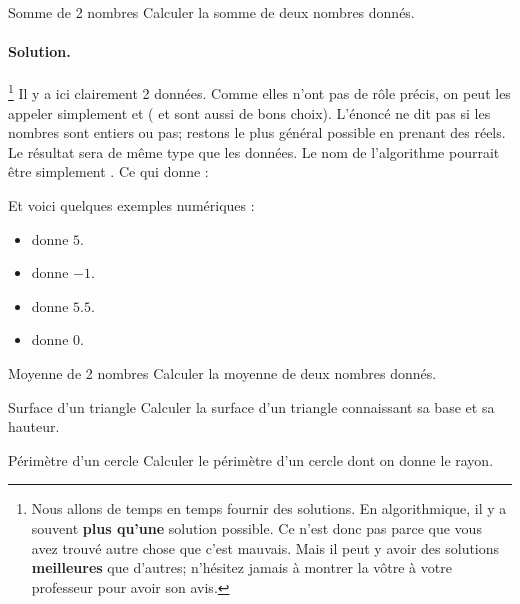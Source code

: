 		\begin{Exercice}{Somme de 2 nombres}
			Calculer la somme de deux nombres donnés.
			\paragraph{Solution.}%
			\footnote{%
				Nous allons de temps en temps 
				fournir des solutions.
				En algorithmique,
				il y a souvent \textbf{plus qu'une} solution possible.
				Ce n'est donc pas parce que vous avez trouvé autre chose
				que c'est mauvais.
				Mais il peut y avoir des solutions \textbf{meilleures}
				que d'autres; 
				n'hésitez jamais à montrer la vôtre
				à votre professeur pour avoir son avis.
			}
			Il y a ici clairement 2 données.
			Comme elles n'ont pas de rôle précis,
			on peut les appeler simplement 
			et 
			( et  sont aussi de bons choix).
			L'énoncé ne dit pas si les nombres sont entiers ou pas;
			restons le plus général possible en prenant des réels.
			Le résultat sera de même type que les données.
			Le nom de l'algorithme pourrait être simplement .
			Ce qui donne :
			\begin{center}
			\end{center}			 
			Et voici quelques exemples numériques :
			\begin{itemize}
			\item {} donne $5$.
			\item {} donne $-1$.
			\item {} donne $5.5$.
			\item {} donne $0$.
			\end{itemize}
			
		\end{Exercice}
	
		\begin{Exercice}{Moyenne de 2 nombres}
			Calculer la moyenne de deux nombres donnés.
		\end{Exercice}
		
		\begin{Exercice}{Surface d’un triangle}
			Calculer la surface d’un triangle connaissant sa base et sa hauteur.
		\end{Exercice}
	
		\begin{Exercice}{Périmètre d’un cercle}
			Calculer le périmètre d’un cercle dont on donne le rayon. 
		\end{Exercice}
	
